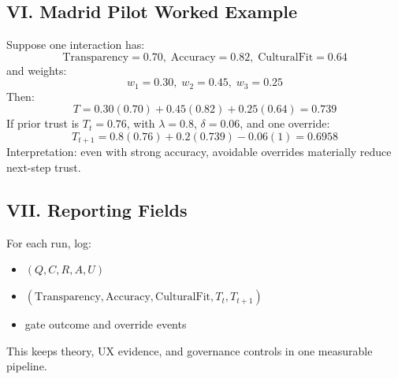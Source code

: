 \subsection*{VI. Madrid Pilot Worked Example}
Suppose one interaction has:
\[
\text{Transparency}=0.70,\;\text{Accuracy}=0.82,\;\text{CulturalFit}=0.64
\]
and weights:
\[
w_1=0.30,\;w_2=0.45,\;w_3=0.25
\]
Then:
\[
T = 0.30(0.70)+0.45(0.82)+0.25(0.64)=0.739
\]
If prior trust is $T_t=0.76$, with $\lambda=0.8$, $\delta=0.06$, and one override:
\[
T_{t+1}=0.8(0.76)+0.2(0.739)-0.06(1)=0.6958
\]
Interpretation: even with strong accuracy, avoidable overrides materially reduce next-step trust.

\subsection*{VII. Reporting Fields}
For each run, log:
\begin{itemize}
  \item $(Q,C,R,A,U)$
  \item $(\text{Transparency}, \text{Accuracy}, \text{CulturalFit}, T_t, T_{t+1})$
  \item gate outcome and override events
\end{itemize}
This keeps theory, UX evidence, and governance controls in one measurable pipeline.
